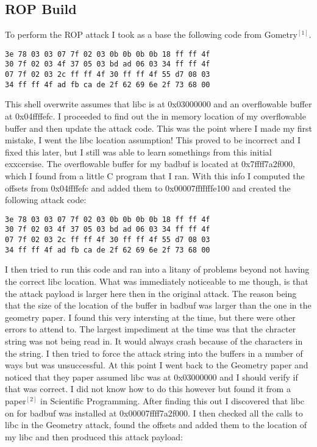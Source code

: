 \documentclass[11pt]{amsart}
\begin{document}
\subsection*{ROP Build}
To perform the ROP attack I took as a base the following code from Gometry$^{[1]}$.
\begin{verbatim}
3e 78 03 03 07 7f 02 03 0b 0b 0b 0b 18 ff ff 4f 
30 7f 02 03 4f 37 05 03 bd ad 06 03 34 ff ff 4f 
07 7f 02 03 2c ff ff 4f 30 ff ff 4f 55 d7 08 03
34 ff ff 4f ad fb ca de 2f 62 69 6e 2f 73 68 00 
\end{verbatim}
This shell overwrite assumes that libc is at 0x03000000 and an overflowable buffer at 0x04ffffefc.  I proceeded to find out the in memory location of my overflowable buffer and then update the attack code.  This was the point where I made my first mistake, I went the libc location assumption!  This proved to be incorrect and I fixed this later, but I still was able to learn somethings from this initial exxcersise.  The overflowable buffer for my badbuf is located at 0x7ffff7a2f000, which I found from a little C program that I ran.  With this info I computed the offsets from 0x04ffffefc and added them to 0x00007fffffffe100 and created the following attack code:
\begin{verbatim}
3e 78 03 03 07 7f 02 03 0b 0b 0b 0b 18 ff ff 4f 
30 7f 02 03 4f 37 05 03 bd ad 06 03 34 ff ff 4f 
07 7f 02 03 2c ff ff 4f 30 ff ff 4f 55 d7 08 03
34 ff ff 4f ad fb ca de 2f 62 69 6e 2f 73 68 00 
\end{verbatim}
I then tried to run this code and ran into a litany of problems beyond not having the correct libc location.  What was immediately noticeable to me though, is that the attack payload is larger here then in the original attack.  The reason being that the size of the location of the buffer in badbuf was larger than the one in the geometry paper.  I found this very intersting at the time, but there were other errors to attend to.  The largest impediment at the time was that the chracter string was not being read in.  It would always crash because of the characters in the string.  I then tried to force the attack string into the buffers in a number of ways but was unsuccessful.
At this point I went back to the Geometry paper and noticed that they paper assumed libc was at 0x03000000 and I should verify if that was correct.  I did not know how to do this however but found it from a paper$^{[2]}$ in Scientific Programming.  After finding this out I discovered that libc on for badbuf was installed at 0x00007ffff7a2f000. I then checked all the calls to libc in the Geometry attack, found the offsets and added them to the location of my libc and then produced this attack payload:
\end{document}
